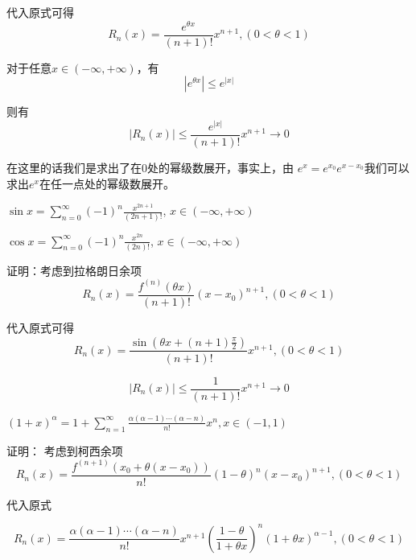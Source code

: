 \documentclass[lang=cn,10pt]{elegantbook}
\begin{document}
代入原式可得
\begin{equation*}
	R_{n}(x)=\frac{e^{\theta x}}{(n+1)!}x^{n+1},(0<\theta<1)
\end{equation*}

对于任意$x \in (-\infty ,+\infty )$，有
\begin{equation*}
	|e^{\theta x}|\le e^{ |x|}
\end{equation*}

则有
\begin{equation*}
	|R_{n}(x)|\le\frac{e^{ |x|}}{(n+1)!}x^{n+1}\longrightarrow 0
\end{equation*}

在这里的话我们是求出了在0处的幂级数展开，事实上，由
$e^{x}=e^{x_{0}}e^{x-x_{0}}$我们可以求出$e^{x}$在任一点处的幂级数展开。

\begin{conclusion}
$	\sin x =\sum_{n=0}^{\infty }(-1)^{n}\frac{x^{2n+1} }{(2n+1)!}$,
$x \in (-\infty ,+\infty )$

$	\cos x =\sum_{n=0}^{\infty }(-1)^{n}\frac{x^{2n} }{(2n)!}$,
$x \in (-\infty ,+\infty )$
\end{conclusion}

证明：考虑到拉格朗日余项
\begin{equation*}
	R_{n}(x)=\frac{{f}^{(n)}(\theta x)}{(n+1)!}(x-x_{0})^{n+1},(0<\theta<1)
\end{equation*}

代入原式可得
\begin{equation*}
	R_{n}(x)=\frac{\sin(\theta x+(n+1)\frac{\pi}{2})}{(n+1)!}x^{n+1},(0<\theta<1)
\end{equation*}

\begin{equation*}
	|R_{n}(x)|\le\frac{1}{(n+1)!}x^{n+1}\longrightarrow 0
\end{equation*}

\begin{conclusion}
	$(1+x)^{\alpha} =1 + \sum_{n=1}^{\infty }\frac{\alpha(\alpha-1)\cdots(\alpha-n)}{n!}x^{n},x\in (-1,1)$
\end{conclusion}

证明：
考虑到柯西余项
\begin{equation*}
	R_{n}(x)=\frac{{f}^{(n+1)}(x_{0}+\theta(x-x_{0}))}{n!}(1-\theta)^{n}(x-x_{0})^{n+1}, (0<\theta<1)
\end{equation*}

代入原式

\begin{equation*}
	R_{n}(x)=\frac{\alpha(\alpha-1)\cdots(\alpha-n)}{n!}x^{n+1}(\frac{1-\theta}{1+\theta x})^{n}(1+\theta x)^{\alpha -1},(0<\theta<1)
\end{equation*}
 
\end{document}
